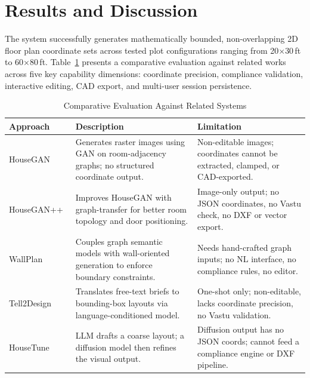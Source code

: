 \documentclass[10pt, twocolumn, letterpaper]{article}
\begin{document}
\section{Results and Discussion}

The system successfully generates mathematically bounded, non-overlapping 2D
floor plan coordinate sets across tested plot configurations ranging from
20$\times$30\,ft to 60$\times$80\,ft. Table~\ref{tab:results} presents a
comparative evaluation against related works across five key capability
dimensions: coordinate precision, compliance validation, interactive editing,
CAD export, and multi-user session persistence.

\begin{table}[!ht]
\caption{Comparative Evaluation Against Related Systems}
\label{tab:results}
\centering
\fontsize{8}{10}\selectfont
\renewcommand{\arraystretch}{1.4}
\begin{tabular}{@{}p{0.85in}p{1.1in}p{1.1in}@{}}
\toprule
\textbf{Approach} & \textbf{Description} & \textbf{Limitation} \\
\midrule

HouseGAN~\cite{houseGAN}
&
Generates raster images using GAN on room-adjacency graphs; no structured coordinate output.
&
Non-editable images; coordinates cannot be extracted, clamped, or CAD-exported. \\[4pt]

HouseGAN++~\cite{houseGANpp}
&
Improves HouseGAN with graph-transfer for better room topology and door positioning.
&
Image-only output; no JSON coordinates, no Vastu check, no DXF or vector export. \\[4pt]

WallPlan~\cite{wallplan}
&
Couples graph semantic models with wall-oriented generation to enforce boundary constraints.
&
Needs hand-crafted graph inputs; no NL interface, no compliance rules, no editor. \\[4pt]

Tell2Design~\cite{tell2design}
&
Translates free-text briefs to bounding-box layouts via language-conditioned model.
&
One-shot only; non-editable, lacks coordinate precision, no Vastu validation. \\[4pt]

HouseTune~\cite{housetune}
&
LLM drafts a coarse layout; a diffusion model then refines the visual output.
&
Diffusion output has no JSON coords; cannot feed a compliance engine or DXF pipeline. \\[4pt]


\end{tabular}
\end{table}
\end{document}
